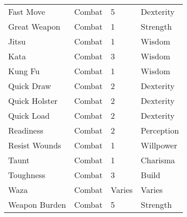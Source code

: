 \documentclass[twoside]{book}
\begin{document}
\begin{longtable}{p{1.25in}lll}
  \raggedright
           Fast Move 
  &
   Combat 
  &
   5 
  &
   Dexterity 
  \tabularnewline
      
  \raggedright
           Great Weapon 
  &
   Combat 
  &
   1 
  &
   Strength 
  \tabularnewline
      
  \raggedright
           Jitsu 
  &
   Combat 
  &
   1 
  &
   Wisdom 
  \tabularnewline
      
  \raggedright
           Kata 
  &
   Combat 
  &
   3 
  &
   Wisdom 
  \tabularnewline
      
  \raggedright
           Kung Fu 
  &
   Combat 
  &
   1 
  &
   Wisdom 
  \tabularnewline
      
  \raggedright
           Quick Draw 
  &
   Combat 
  &
   2 
  &
   Dexterity 
  \tabularnewline
      
  \raggedright
           Quick Holster 
  &
   Combat 
  &
   2 
  &
   Dexterity 
  \tabularnewline
      
  \raggedright
           Quick Load 
  &
   Combat 
  &
   2 
  &
   Dexterity 
  \tabularnewline
      
  \raggedright
           Readiness 
  &
   Combat 
  &
   2 
  &
   Perception 
  \tabularnewline
      
  \raggedright
           Resist Wounds 
  &
   Combat 
  &
   1 
  &
   Willpower 
  \tabularnewline
      
  \raggedright
           Taunt 
  &
   Combat 
  &
   1 
  &
   Charisma 
  \tabularnewline
      
  \raggedright
           Toughness 
  &
   Combat 
  &
   3 
  &
   Build 
  \tabularnewline
      
  \raggedright
           Waza 
  &
   Combat 
  &
   Varies 
  &
   Varies 
  \tabularnewline
      
  \raggedright
           Weapon Burden 
  &
   Combat 
  &
   5 
  &
   Strength 
  \tabularnewline
      
\end{longtable}
    
\end{document}
